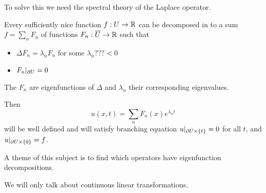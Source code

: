 To solve this we need the spectral theory of the Laplace operator.

\begin{prop}
	Every sufficiently nice function $f: U \to \mathbb{R}$ can be decomposed in to a sum $f=\sum_n F_n$ of functions $F_n: \overline U \to \mathbb{R}$ such that
	\begin{itemize}
		\item $\Delta F_n = \lambda_n F_n$ for some $\lambda_n ???< 0$
		\item $F_n|_{\partial U} = 0$
	\end{itemize}
	The $F_n$ are eigenfunctions of $\Delta$ and $\lambda_n$ their corresponding eigenvalues.
\end{prop}

Then
\[u(x,t) = \sum_n F_n(x) e^{\lambda_n t}\]
will be well defined and will satisfy
branching equation $u|_{\partial U \times \{t\}}=0$ for all $t$, and $u|_{\partial U \times \{0\}}=f$.

A theme of this subject is to find which operators have eigenfunction decompositions.

We will only talk about continuous linear transformations.